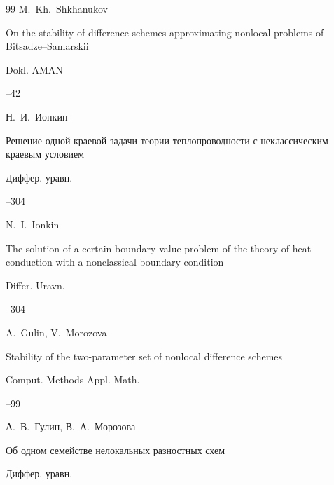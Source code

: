\begin{thebibliography}{99}
\by M.~Kh.~Shkhanukov

\paper On the stability of difference schemes approximating nonlocal problems of Bitsadze--Samarskii

\jour Dokl. AMAN




--42






\by Н.~И.~Ионкин

\paper Решение одной краевой задачи теории теплопроводности с неклассическим краевым условием

\jour Диффер. уравн.




--304

\misctransl

\by N.~I.~Ionkin 

\paper The solution of a certain boundary value problem of the theory of heat conduction with a nonclassical boundary condition

\jour Differ. Uravn.




–304






\by A.~Gulin, V.~Morozova

\paper Stability of the two-parameter set of nonlocal difference schemes

\jour Comput. Methods Appl. Math. 




--99






\by А.~В.~Гулин, В.~А.~Морозова

\paper Об одном семействе нелокальных разностных схем

\jour Диффер. уравн.



\end{thebibliography}
